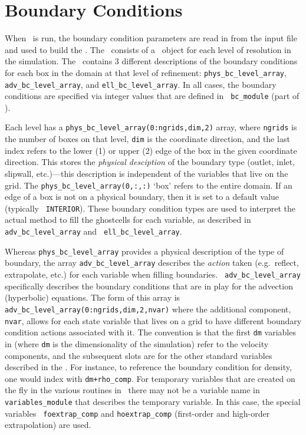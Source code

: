 \section{Boundary Conditions}

\label{sec:arch:bcs}

When \maestro\ is run, the boundary condition parameters are read in
from the input file and used to build the \bctower.  The
\bctower\ consists of a \bclevel\ object for each level of resolution
in the simulation.  The \bclevel\ contains 3 different descriptions of
the boundary conditions for each box in the domain at that level of
refinement: {\tt phys\_bc\_level\_array}, {\tt adv\_bc\_level\_array},
and {\tt ell\_bc\_level\_array}.  In all cases, the boundary
conditions are specified via integer values that are defined in {\tt
  bc\_module} (part of \boxlib).

Each level has a {\tt phys\_bc\_level\_array(0:ngrids,dim,2)} array,
where {\tt ngrids} is the number of boxes on that level, {\tt dim} is
the coordinate direction, and the last index refers to the lower (1)
or upper (2) edge of the box in the given coordinate direction.  This
stores the {\em physical desciption} of the boundary type (outlet, inlet,
slipwall, etc.)---this description is independent of the variables
that live on the grid.  The {\tt phys\_bc\_level\_array(0,:,:)} `box'
refers to the entire domain.  If an edge of a box is not on a physical
boundary, then it is set to a default value (typically {\tt
  INTERIOR}).  These boundary condition types are used to interpret
the actual method to fill the ghostcells for each variable, as
described in {\tt adv\_bc\_level\_array} and {\tt
  ell\_bc\_level\_array}.


Whereas {\tt phys\_bc\_level\_array} provides a physical description
of the type of boundary, the array {\tt adv\_bc\_level\_array}
describes the {\em action} taken (e.g.\ reflect, extrapolate, etc.)
for each variable when filling boundaries.  {\tt
  adv\_bc\_level\_array} specifically describes the boundary
conditions that are in play for the advection (hyperbolic) equations.
The form of this array is {\tt
  adv\_bc\_level\_array(0:ngrids,dim,2,nvar)} where the additional
component, {\tt nvar}, allows for each state variable that lives on a
grid to have different boundary condition actions associated with it.
The convention is that the first {\tt dm} variables in \bclevel (where {\tt dm} is
the dimensionality of the simulation) refer to the
velocity components, and the subsequent slots are for the other
standard variables described in the .  For
instance, to reference the boundary condition for density, one would
index with {\tt dm+rho\_comp}.  For temporary variables that are
created on the fly in the various routines in \maestro\ there may not
be a variable name in {\tt variables\_module} that describes the
temporary variable.  In this case, the special variables {\tt
  foextrap\_comp} and {\tt hoextrap\_comp} (first-order and high-order
extrapolation) are used.


